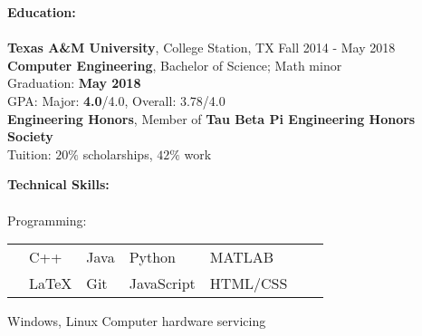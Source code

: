\documentclass[12pt]{article}
\begin{document}
\begin{flushleft}
\begin{outline}[compactitem]

\newlength{\upspacelength}
\setlength{\upspacelength}{-0.6px}
\newcommand{\upspace}{\vspace{\upspacelength}}
\newcommand{\zzz}[1]{\upspace \0 \textbf{#1} \\ \vspace{-0.8\baselineskip} \hrulefill \vspace{-2px} \\ }
\let\oldOne\1\let\oldTwo\2\let\oldThree\3\let\oldFour\4
\renewcommand{\1}{\upspace \oldOne  }
\renewcommand{\2}{\upspace \oldTwo  }
\renewcommand{\3}{\upspace \oldThree}
\renewcommand{\4}{\upspace \oldFour }



\zzz{Education:}
  \1 \textbf{Texas A\&M University}, College Station, TX \hfill Fall 2014 - May 2018
  \\ \textbf{Computer Engineering}, Bachelor of Science; Math minor
  \\ Graduation: \textbf{May 2018}
  \\ GPA:  Major: \textbf{4.0}/4.0, Overall: 3.78/4.0
  \\ \textbf{Engineering Honors}, Member of \textbf{Tau Beta Pi Engineering Honors Society}
  \\ Tuition: $20\%$ scholarships, $42\%$ work

\zzz{Technical Skills:}
  \1 Programming: 
    \\
    \vspace{-\baselineskip}\vspace{-\upspacelength}
    \begin{tabularx}{\textwidth}{X X X X X X X}
      & C++   & Java & Python     & MATLAB   \upspace \\
      & LaTeX & Git  & JavaScript & HTML/CSS \upspace \\
    \end{tabularx}
    \vspace{-5px}\upspace
  \1 
    Windows, Linux
    \hfill{}\hspace{1px}
    Computer hardware servicing
    \hfill\hfill


\end{outline}
\end{flushleft}
\end{document}
